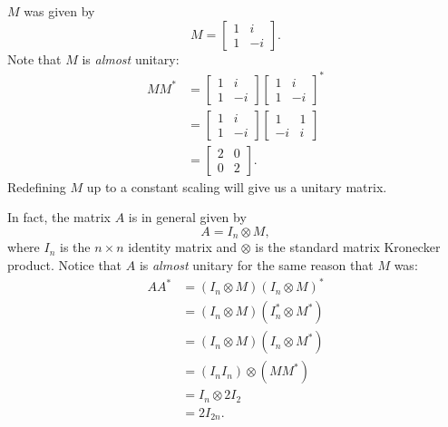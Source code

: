 \documentclass[12pt]{article}
\newcommand{\ita}[1]{\textit{#1}}
\theoremstyle{definition}
\theoremstyle{remark}
\begin{document}
$M$ was given by 
\begin{equation}
    M = 
    \begin{bmatrix}
        1 & i \\
        1 & -i
    \end{bmatrix}.
\end{equation}
Note that $M$ is \ita{almost} unitary:
\begin{equation}
    \begin{split}
        M M^* & = 
        \begin{bmatrix}
            1 & i \\
            1 & -i
        \end{bmatrix}
        \begin{bmatrix}
            1 & i \\
            1 & -i
        \end{bmatrix}^* \\
        & =
        \begin{bmatrix}
            1 & i \\
            1 & -i
        \end{bmatrix}
        \begin{bmatrix}
            1 & 1 \\
            -i & i
        \end{bmatrix} \\
        & = 
        \begin{bmatrix}
            2 & 0 \\
            0 & 2
        \end{bmatrix}.
    \end{split}
\end{equation}
Redefining $M$ up to a constant scaling will give us a unitary matrix.

In fact, the matrix $A$ is in general given by 
\begin{equation}
    A = I_n \otimes M,
\end{equation}
where $I_n$ is the $n \times n$ identity matrix and $\otimes$ is the standard matrix Kronecker product. Notice that $A$ is \ita{almost} unitary for the same reason that $M$ was:
\begin{equation}
    \begin{split}
        A A^* & = \left( I_n \otimes M \right) \left( I_n \otimes M \right)^* \\
        & = \left( I_n \otimes M \right) \left( I_n^* \otimes M^* \right) \\
        & = \left( I_n \otimes M \right) \left( I_n \otimes M^* \right) \\
        & = \left( I_n I_n \right) \otimes \left( M M^* \right) \\
        & = I_n \otimes 2 I_2 \\
        & = 2 I_{2n}.
    \end{split}
\end{equation}
\end{document}
